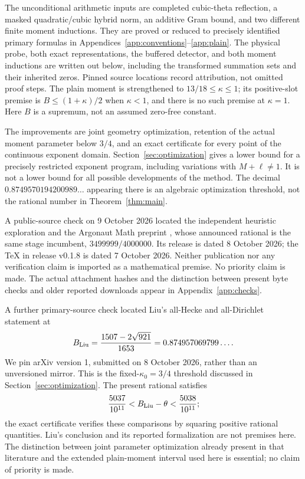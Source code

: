 \documentclass[12pt]{article}
\begin{document}
The unconditional arithmetic inputs are completed cubic-theta
reflection, a masked quadratic/cubic hybrid norm, an additive Gram
bound, and two different finite moment inductions.  They are proved
or reduced to precisely identified primary formulas in
Appendices~\ref{app:conventions}--\ref{app:plain}.
The physical probe, both exact representations, the buffered
detector, and both moment inductions are written out below,
including the transformed summation sets and their inherited zeros.
Pinned source locations record attribution, not omitted proof steps.
The plain moment is strengthened to \(13/18\le\kappa\le1\);
its positive-slot premise is \(B\le(1+\kappa)/2\) when
\(\kappa<1\), and there is no such premise at \(\kappa=1\).
Here \(B\) is a supremum, not an assumed zero-free constant.

The improvements are joint geometry optimization, retention of the
actual moment parameter below \(3/4\), and an exact certificate for
every point of the continuous exponent domain.
Section~\ref{sec:optimization} gives a lower bound for a precisely
restricted exponent program, including variations with \(M+\ell\ne1\).
It is not a lower bound for all possible developments of the method.
The decimal \(0.8749570194200989\ldots\) appearing there is an
algebraic optimization threshold, not the rational number in
Theorem~\ref{thm:main}.

A public-source check on 9 October 2026 located the independent
heuristic exploration \cite{Exploration} and the Argonaut Math
preprint \cite{Argonaut}, whose announced rational is the same
stage incumbent, \(3499999/4000000\).  Its release is dated
8 October 2026; the TeX in release v0.1.8 is dated 7 October 2026.
Neither publication nor any verification claim is imported as a
mathematical premise.  No priority claim is made.
The actual attachment hashes and the distinction between present
byte checks and older reported downloads appear in
Appendix~\ref{app:checks}.

A further primary-source check located Liu's
\cite[Theorem 21.1]{Liu} all-Hecke and all-Dirichlet statement at
\[
 B_{\rm Liu}=\frac{1507-2\sqrt{921}}{1653}
              =0.874957069799\ldots .
\]
We pin arXiv version 1, submitted on 8 October 2026, rather than
an unversioned mirror.  This is the fixed-\(\kappa_0=3/4\)
threshold discussed in Section~\ref{sec:optimization}.
The present rational satisfies
\[
 \frac{5037}{10^{11}}<B_{\rm Liu}-\theta
                         <\frac{5038}{10^{11}};
\]
the exact certificate verifies these comparisons by squaring
positive rational quantities.  Liu's conclusion and its reported
formalization are not premises here.  The distinction between
joint parameter optimization already present in that literature
and the extended plain-moment interval used here is essential;
no claim of priority is made.
\end{document}
